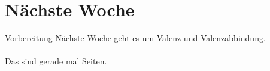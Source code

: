 \section{Nächste Woche}

\begin{frame}
  {Vorbereitung}
  \onslide<+->
  \onslide<+->
  \centering 
  \large
  Nächste Woche geht es um Valenz und Valenzabbindung.\\
  \onslide<+->
  \Zeile
  \\
    \onslide<+->
    \Viertelzeile
    Das sind gerade mal  Seiten.
\end{frame}
